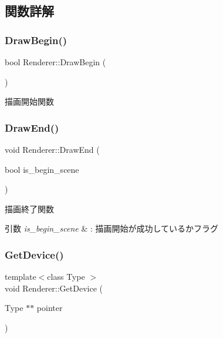 \subsection{関数詳解}
\mbox{\label{class_renderer_af420951c9c163f1151bd6600df204cee}} 
\subsubsection{\texorpdfstring{Draw\+Begin()}{DrawBegin()}}
{\footnotesize\ttfamily bool Renderer\+::\+Draw\+Begin (\begin{DoxyParamCaption}{ }\end{DoxyParamCaption})}



描画開始関数 

\mbox{\label{class_renderer_a0393849bd4178a33861780bf07b0deee}} 
\subsubsection{\texorpdfstring{Draw\+End()}{DrawEnd()}}
{\footnotesize\ttfamily void Renderer\+::\+Draw\+End (\begin{DoxyParamCaption}\item[{bool}]{is\+\_\+begin\+\_\+scene }\end{DoxyParamCaption})}



描画終了関数 


\begin{DoxyParams}{引数}
{\em is\+\_\+begin\+\_\+scene} & \+: 描画開始が成功しているかフラグ \\
\hline
\end{DoxyParams}
\mbox{\label{class_renderer_a6610c3a85a8170141c4584cecf4a6d15}} 
\subsubsection{\texorpdfstring{Get\+Device()}{GetDevice()}}
{\footnotesize\ttfamily template$<$class Type $>$ \\
void Renderer\+::\+Get\+Device (\begin{DoxyParamCaption}\item[{Type $\ast$$\ast$}]{pointer }\end{DoxyParamCaption})\hspace{0.3cm}{\ttfamily [inline]}}



